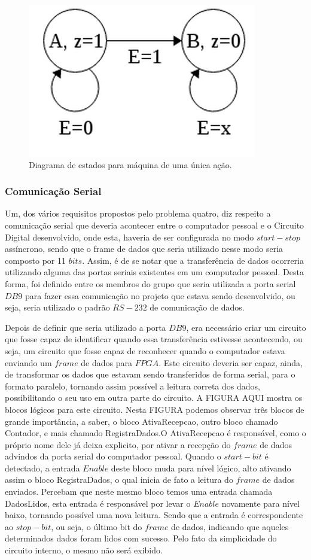 \documentclass[12pt]{article}
\begin{document}
\begin{figure}[!htbp]
\centering
\includegraphics[width=.3\textwidth]{img/p4/fsm.png}
\caption{Diagrama de estados para máquina de uma única ação.}
\label{fig:fsm}
\end{figure}


\subsubsection{Comunicação Serial}

Um, dos vários requisitos propostos pelo problema quatro, diz respeito a comunicação serial que deveria acontecer entre o computador pessoal e o Circuito Digital desenvolvido, onde esta, haveria de ser configurada no modo $start-stop$ assíncrono, sendo que o frame de dados que seria utilizado nesse modo seria composto por 11 $bits$. Assim, é de se notar que a transferência de dados ocorreria utilizando alguma das portas seriais existentes em um computador pessoal. Desta forma, foi definido entre os membros do grupo que seria utilizada a porta serial $DB9$ para fazer essa comunicação no projeto que estava sendo desenvolvido, ou seja, seria utilizado o padrão $RS-232$ de comunicação de dados.

Depois de definir que seria utilizado a porta $DB9$, era necessário criar um circuito que fosse capaz de identificar quando essa transferência estivesse acontecendo, ou seja, um circuito que fosse capaz de reconhecer quando o computador estava enviando um $frame$ de dados para $FPGA$. Este circuito deveria ser capaz, ainda, de transformar os dados que estavam sendo transferidos de forma serial, para o formato paralelo, tornando assim possível a leitura correta dos dados, possibilitando o seu uso em outra parte do circuito. A FIGURA AQUI mostra os blocos lógicos para este circuito. Nesta FIGURA podemos observar três blocos de grande importância, a saber, o bloco AtivaRecepcao, outro bloco chamado Contador, e mais chamado RegistraDados.O AtivaRecepcao é responsável, como o próprio nome dele já deixa explicito, por ativar a recepção do $frame$ de dados advindos da porta serial do computador pessoal. Quando o $start-bit$ é detectado, a entrada $Enable$ deste bloco muda para nível lógico, alto ativando assim o bloco RegistraDados, o qual inicia de fato a leitura do $frame$ de dados enviados. Percebam que neste mesmo bloco temos uma entrada chamada DadosLidos, esta entrada é responsável por levar o $Enable$ novamente para nível baixo, tornando possível uma nova leitura. Sendo que a entrada é correspondente ao $stop-bit$, ou seja, o último bit do $frame$ de dados, indicando que aqueles determinados dados foram lidos com sucesso. Pelo fato da simplicidade do circuito interno, o mesmo não será exibido. 
\end{document}

